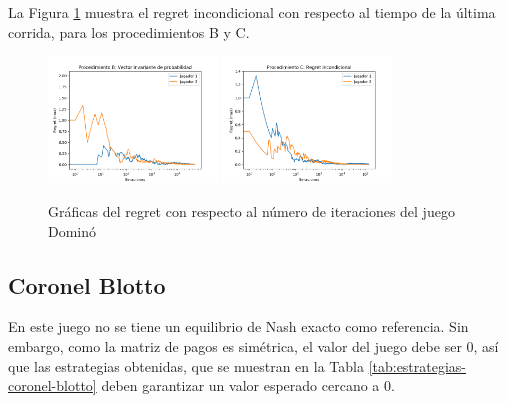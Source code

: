 La Figura \ref{fig:regret-domino} muestra el regret incondicional con respecto al tiempo de la última corrida, para los procedimientos B y C.

\begin{figure}[ht]
\caption{Gráficas del regret con respecto al número de iteraciones del juego Dominó}
\label{fig:regret-domino}
\centering
\includegraphics[width=0.4\textwidth]{graficas/domino/procedimiento-B.png}
\includegraphics[width=0.4\textwidth]{graficas/domino/procedimiento-C.png}
\end{figure}

\subsection{Coronel Blotto}

En este juego no se tiene un equilibrio de Nash exacto como referencia. Sin embargo, como la matriz de pagos es simétrica, el valor del juego debe ser $0$, así que las estrategias obtenidas, que se muestran en la Tabla \ref{tab:estrategias-coronel-blotto} deben garantizar un valor esperado cercano a $0$. 

